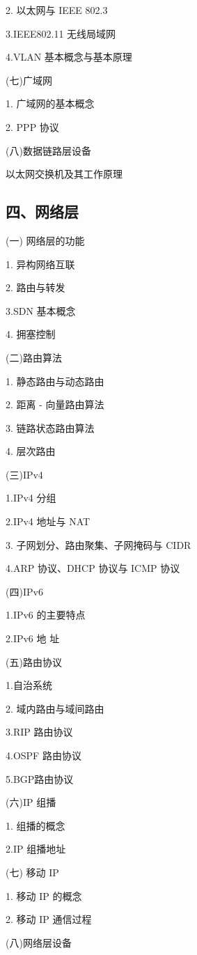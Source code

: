 \documentclass[10pt]{article}
\begin{document}
2. 以太网与 IEEE 802.3 

3.IEEE802.11 无线局域网 

4.VLAN 基本概念与基本原理

(七)广域网

1. 广域网的基本概念

2.{\color{red} PPP 协议}

(八)数据链路层设备

{\color{red}以太网交换机及其工作原理}

\subsection*{四、网络层}

(一) 网络层的功能

1. 异构网络互联

2. 路由与转发

3.{\color{red}SDN 基本概念}

4. 拥塞控制

(二)路由算法

1. 静态路由与动态路由

2. 距离 - 向量路由算法

3. 链路状态路由算法

4. 层次路由 

(三)IPv4 

1.IPv4 分组 

2.IPv4 地址与 NAT 

3. 子网划分、路由聚集、子网掩码与 CIDR 

4.ARP 协议、DHCP 协议与 ICMP 协议 

(四){\color{red}IPv6} 

1.IPv6 的主要特点 

2.IPv6 地 址

(五)路由协议

1.自治系统 

2. 域内路由与域间路由 

3.RIP 路由协议 

4.OSPF 路由协议 

5.{\color{red}BGP路由协议}


(六){\color{red}IP 组播}


1. 组播的概念


2.IP 组播地址

(七) {\color{red}移动 IP}

1. 移动 IP 的概念

2. 移动 IP 通信过程

(八)网络层设备
\end{document}
